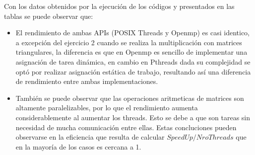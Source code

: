 Con los datos obtenidos por la ejecución de los códigos y presentados en las tablas se puede observar que:

\begin{itemize}
\item El rendimiento de ambas APIs (POSIX Threads y Openmp) es casi identico, a excepción del ejercicio 2 cuando se realiza la multiplicación con matrices triangulares, la diferencia es que en Openmp es sencillo de implementar una asignación de tarea dinámica, en cambio en Pthreads dada su complejidad se optó por realizar asignación estática de trabajo, resultando así una diferencia de rendimiento entre ambas implementaciones.
\item También se puede observar que las operaciones aritmeticas de matrices son altamente paralelizables, por lo que el rendimiento aumenta considerablemente al aumentar los threads. Esto se debe a que son tareas sin necesidad de mucha comunicación entre ellas. Estas concluciones pueden observarse en la eficiencia que resulta de calcular $ SpeedUp/NroThreads $ que en la mayoría de los casos es cercana a 1.
\end{itemize}